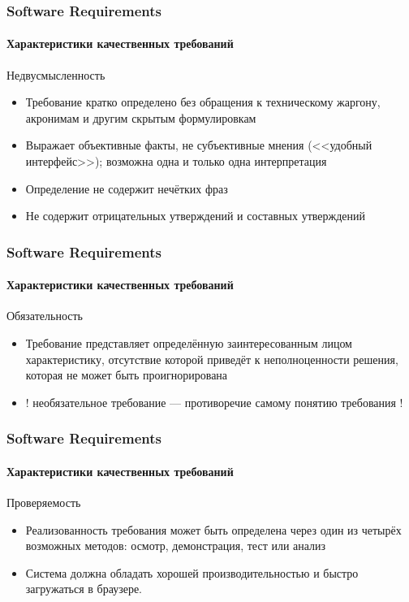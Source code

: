 \documentclass[aspectratio=169, 12pt]{beamer}
\begin{document}
\begin{frame}[t]
    \frametitle{Software Requirements}
    \framesubtitle{Характеристики качественных требований}
    Недвусмысленность \newline \pause
    \begin{itemize}
        \item Требование кратко определено без обращения к техническому жаргону, акронимам
              и другим скрытым формулировкам \pause
        \item Выражает объективные факты, не субъективные мнения (<<удобный интерфейс>>);
              возможна одна и только одна интерпретация \pause
        \item Определение не содержит нечётких фраз \pause
        \item Не содержит отрицательных утверждений и составных утверждений
    \end{itemize}
\end{frame}

\begin{frame}[t]
    \frametitle{Software Requirements}
    \framesubtitle{Характеристики качественных требований}
    Обязательность \newline
    \begin{itemize}
        \item Требование представляет определённую заинтересованным лицом характеристику,
              отсутствие которой приведёт к неполноценности решения, которая не может быть проигнорирована \newline \pause
        \item ! необязательное требование --- противоречие самому понятию требования !
    \end{itemize}
\end{frame}

\begin{frame}[t]
    \frametitle{Software Requirements}
    \framesubtitle{Характеристики качественных требований}
    Проверяемость \newline
    \begin{itemize}
        \item Реализованность требования может быть определена через один из четырёх возможных методов:
              осмотр, демонстрация, тест или анализ \newline \pause
        \item Система должна обладать хорошей производительностью и быстро загружаться в браузере.
    \end{itemize}
\end{frame}
\end{document}
